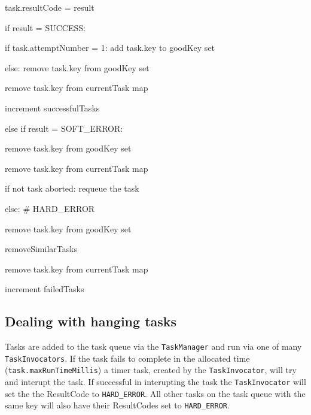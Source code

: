 \begin{code}
\begin{code}
\begin{code}
\begin{code}
\begin{code}
          \item task.resultCode = result
          \item if result = SUCCESS:
          \begin{code}
            \item if task.attemptNumber = 1: add task.key to goodKey set
            \item else: remove task.key from goodKey set
            \item remove task.key from currentTask map
            \item increment successfulTasks
          \end{code}
          \item else if result = SOFT\_ERROR:
          \begin{code}
            \item remove task.key from goodKey set
            \item remove task.key from currentTask map
            \item if not task aborted: requeue the task
          \end{code}
          \item else: \# HARD\_ERROR
          \begin{code}
            \item remove task.key from goodKey set
            \item removeSimilarTasks
            \item remove task.key from currentTask map
            \item increment failedTasks
          \end{code}
        \end{code}
      \end{code}
    \end{code}
  \end{code}
\end{code}

\subsection{Dealing with hanging tasks} Tasks are added to the task queue via 
the \texttt{TaskManager} and run via one of many \texttt{TaskInvocators}. If 
the task fails to complete in the allocated time 
(\texttt{task.maxRunTimeMillis}) a timer task, created by the 
\texttt{TaskInvocator}, will try and interupt the task. If successful in 
interupting the task the \texttt{TaskInvocator} will set the the ResultCode to 
\texttt{HARD\_ERROR}. All 
other tasks on the task queue with the same key will also have their 
ResultCodes set to \texttt{HARD\_ERROR}.

